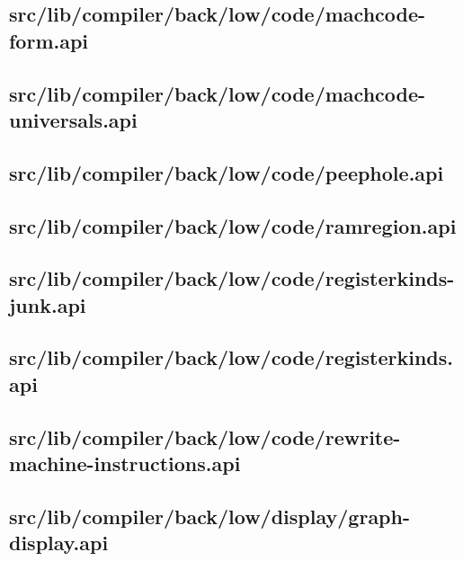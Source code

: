 \subsection{src/lib/compiler/back/low/code/machcode-form.api}


\subsection{src/lib/compiler/back/low/code/machcode-universals.api}


\subsection{src/lib/compiler/back/low/code/peephole.api}


\subsection{src/lib/compiler/back/low/code/ramregion.api}


\subsection{src/lib/compiler/back/low/code/registerkinds-junk.api}


\subsection{src/lib/compiler/back/low/code/registerkinds.api}


\subsection{src/lib/compiler/back/low/code/rewrite-machine-instructions.api}


\subsection{src/lib/compiler/back/low/display/graph-display.api}


